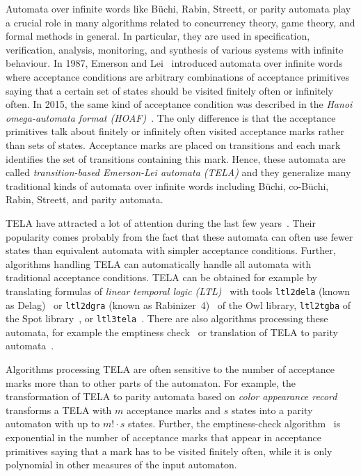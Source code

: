 \documentclass[a4paper,UKenglish,cleveref,autoref,thm-restate]{lipics-v2021}
\begin{document}
Automata over infinite words like Büchi, Rabin, Streett, or parity
automata play a crucial role in many algorithms related to 
concurrency theory, game theory, and formal methods in general. In
particular, they are used in specification, verification, analysis,
monitoring, and synthesis of various systems with infinite
behaviour. In 1987, Emerson and Lei~\cite{emerson.87.scp} introduced
automata over infinite words where acceptance conditions are arbitrary
combinations of acceptance primitives saying that a certain set of
states should be visited finitely often or infinitely often. In 2015,
the same kind of acceptance condition was described in the \emph{Hanoi
  omega-automata format (HOAF)}~\cite{babiak.15.cav}. The only
difference is that the acceptance primitives talk about finitely or
infinitely often visited acceptance marks rather than sets of states.
Acceptance marks are placed on transitions and each mark identifies
the set of transitions containing this mark. Hence, these automata are
called \emph{transition-based Emerson-Lei automata (TELA)} and they
generalize many traditional kinds of automata over infinite words
including Büchi, co-Büchi, Rabin, Streett, and parity automata.

TELA have attracted a lot of attention during the last few
years~\cite{baier.19.atva,major.19.atva,muller.17.gandalf,renkin.20.atva}.
Their popularity comes probably from the fact that these automata can
often use fewer states than equivalent automata with simpler
acceptance conditions. Further, algorithms handling TELA can
automatically handle all automata with traditional acceptance
conditions. TELA can be obtained for example by translating formulas
of \emph{linear temporal logic (LTL)}~\cite{pnueli.77.focs} with tools
\texttt{ltl2dela} (known as Delag)~\cite{muller.17.gandalf} or
\texttt{ltl2dgra} (known as Rabinizer~4)~\cite{kretinsky.18.cav} of
the Owl library, \texttt{ltl2tgba} of the Spot
library~\cite{duret.16.atva2}, or
\texttt{ltl3tela}~\cite{major.19.atva}. There are also algorithms
processing these automata, for example the emptiness
check~\cite{baier.19.atva} or translation of TELA to parity
automata~\cite{renkin.20.atva,casares.22.tacas}.

Algorithms processing TELA are often sensitive to the number of
acceptance marks more than to other parts of the automaton. For
example, the transformation of TELA to parity automata based on
\emph{color appearance record}~\cite{renkin.20.atva} transforms a TELA
with $m$ acceptance marks and $s$ states into a parity automaton with
up to $m!\cdot s$ states. Further, the emptiness-check
algorithm~\cite{baier.19.atva} is exponential in the number of
acceptance marks that appear in acceptance primitives saying that a
mark has to be visited finitely often, while it is only polynomial in
other measures of the input automaton.
\end{document}
